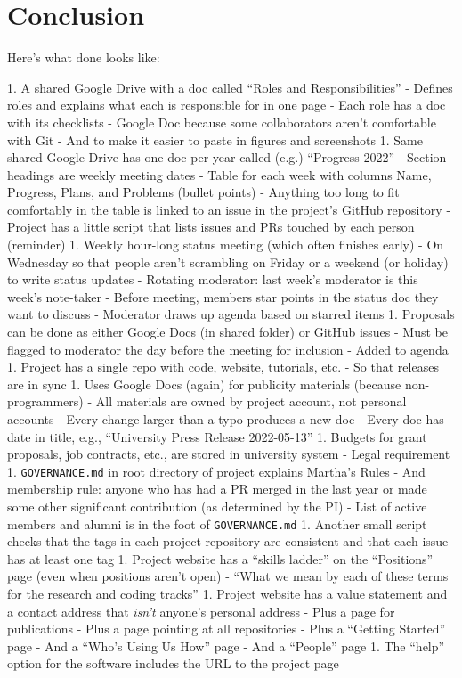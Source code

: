 \documentclass[10pt,letterpaper]{article}
\begin{document}
\section*{Conclusion}

Here's what done looks like:

1.  A shared Google Drive with a doc called ``Roles and Responsibilities''
    - Defines roles and explains what each is responsible for in one page
    - Each role has a doc with its checklists
    - Google Doc because some collaborators aren't comfortable with Git
      - And to make it easier to paste in figures and screenshots
1.  Same shared Google Drive has one doc per year called (e.g.) ``Progress 2022''
    - Section headings are weekly meeting dates
      - Table for each week with columns Name, Progress, Plans, and Problems (bullet points)
      - Anything too long to fit comfortably in the table is linked to an issue in the project's GitHub repository
    - Project has a little script that lists issues and PRs touched by each person (reminder)
1.  Weekly hour-long status meeting (which often finishes early)
    - On Wednesday so that people aren't scrambling on Friday or a weekend (or holiday) to write status updates
    - Rotating moderator: last week's moderator is this week's note-taker
    - Before meeting, members star points in the status doc they want to discuss
    - Moderator draws up agenda based on starred items
1.  Proposals can be done as either Google Docs (in shared folder) or GitHub issues
    - Must be flagged to moderator the day before the meeting for inclusion
    - Added to agenda
1.  Project has a single repo with code, website, tutorials, etc.
    - So that releases are in sync
1.  Uses Google Docs (again) for publicity materials (because non-programmers)
    - All materials are owned by project account, not personal accounts
    - Every change larger than a typo produces a new doc
    - Every doc has date in title, e.g., ``University Press Release 2022-05-13''
1.  Budgets for grant proposals, job contracts, etc., are stored in university system
    - Legal requirement
1.  \texttt{GOVERNANCE.md} in root directory of project explains Martha's Rules
    - And membership rule: anyone who has had a PR merged in the last year or made some other significant contribution (as determined by the PI)
    - List of active members and alumni is in the foot of \texttt{GOVERNANCE.md}
1.  Another small script checks that the tags in each project repository are consistent and that each issue has at least one tag
1.  Project website has a ``skills ladder'' on the ``Positions'' page (even when positions aren't open)
    - ``What we mean by each of these terms for the research and coding tracks''
1.  Project website has a value statement and a contact address that \emph{isn't} anyone's personal address
    - Plus a page for publications
    - Plus a page pointing at all repositories
    - Plus a ``Getting Started'' page
    - And a ``Who's Using Us How'' page
    - And a ``People'' page
1.  The ``help'' option for the software includes the URL to the project page
\end{document}
